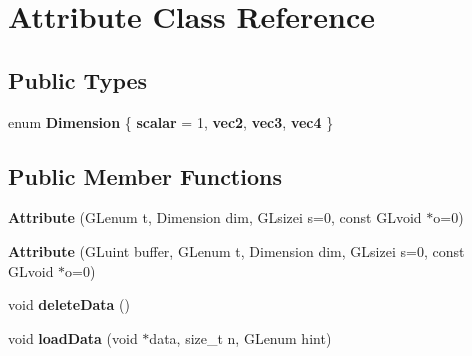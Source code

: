 \hypertarget{class_attribute}{}\section{Attribute Class Reference}
\label{class_attribute}
\subsection*{Public Types}
\begin{DoxyCompactItemize}
\item 
\hypertarget{class_attribute_ab652b3f3bd344279f6f58b9fc8b0736d}{}enum {\bfseries Dimension} \{ {\bfseries scalar} = 1, 
{\bfseries vec2}, 
{\bfseries vec3}, 
{\bfseries vec4}
 \}\label{class_attribute_ab652b3f3bd344279f6f58b9fc8b0736d}

\end{DoxyCompactItemize}
\subsection*{Public Member Functions}
\begin{DoxyCompactItemize}
\item 
\hypertarget{class_attribute_a49656a9d8e78068ffab7fb9335243b40}{}{\bfseries Attribute} (G\+Lenum t, Dimension dim, G\+Lsizei s=0, const G\+Lvoid $\ast$o=0)\label{class_attribute_a49656a9d8e78068ffab7fb9335243b40}

\item 
\hypertarget{class_attribute_ab065aaf1fe2127c087a62f30167bdd03}{}{\bfseries Attribute} (G\+Luint buffer, G\+Lenum t, Dimension dim, G\+Lsizei s=0, const G\+Lvoid $\ast$o=0)\label{class_attribute_ab065aaf1fe2127c087a62f30167bdd03}

\item 
\hypertarget{class_attribute_ad3c383ce9cd15736d536d1cbc1cec088}{}void {\bfseries delete\+Data} ()\label{class_attribute_ad3c383ce9cd15736d536d1cbc1cec088}

\item 
\hypertarget{class_attribute_a6d4901774d60df8795ab7b5fbefd4ecc}{}void {\bfseries load\+Data} (void $\ast$data, size\+\_\+t n, G\+Lenum hint)\label{class_attribute_a6d4901774d60df8795ab7b5fbefd4ecc}

\end{DoxyCompactItemize}

